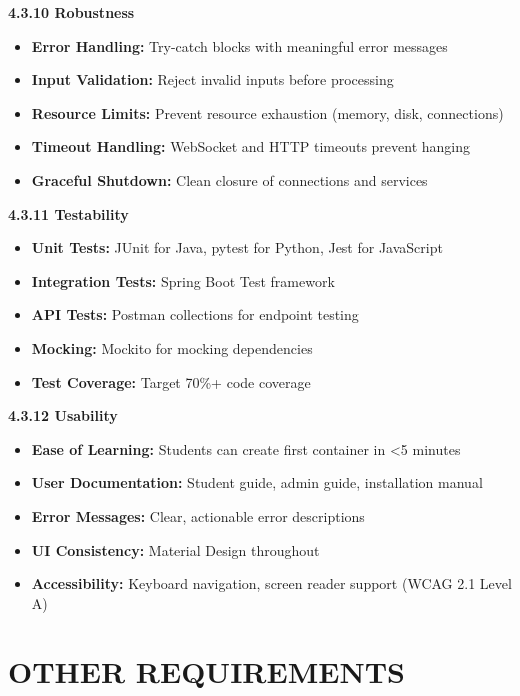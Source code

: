 \documentclass[12pt,a4paper]{article}
\begin{document}
\textbf{4.3.10 Robustness}

\begin{itemize}[noitemsep]
    \item \textbf{Error Handling:} Try-catch blocks with meaningful error messages
    \item \textbf{Input Validation:} Reject invalid inputs before processing
    \item \textbf{Resource Limits:} Prevent resource exhaustion (memory, disk, connections)
    \item \textbf{Timeout Handling:} WebSocket and HTTP timeouts prevent hanging
    \item \textbf{Graceful Shutdown:} Clean closure of connections and services
\end{itemize}

\textbf{4.3.11 Testability}

\begin{itemize}[noitemsep]
    \item \textbf{Unit Tests:} JUnit for Java, pytest for Python, Jest for JavaScript
    \item \textbf{Integration Tests:} Spring Boot Test framework
    \item \textbf{API Tests:} Postman collections for endpoint testing
    \item \textbf{Mocking:} Mockito for mocking dependencies
    \item \textbf{Test Coverage:} Target 70\%+ code coverage
\end{itemize}

\textbf{4.3.12 Usability}

\begin{itemize}[noitemsep]
    \item \textbf{Ease of Learning:} Students can create first container in <5 minutes
    \item \textbf{User Documentation:} Student guide, admin guide, installation manual
    \item \textbf{Error Messages:} Clear, actionable error descriptions
    \item \textbf{UI Consistency:} Material Design throughout
    \item \textbf{Accessibility:} Keyboard navigation, screen reader support (WCAG 2.1 Level A)
\end{itemize}

\section{OTHER REQUIREMENTS}
\end{document}
